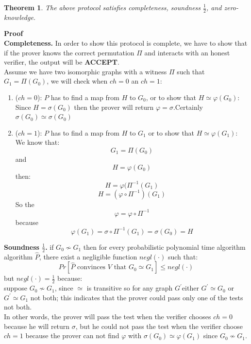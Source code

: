 \documentclass[12pt,a4paper]{article}
\newtheorem{thm}{Theorem}
\begin{document}
\begin{thm}\cite{lec-notes1:3}
The above protocol satisfies completeness, soundness $\frac{1}{2}$, and zero-knowledge.	
\end{thm}
\textbf{Proof}\\
\textbf{Completeness.}
In order to show this protocol is complete, we have to show that if the prover knows the correct permutation $\Pi$ and interacts with an honest verifier, the output will be \textbf{ACCEPT}.\\
Assume we have two isomorphic graphs with a witness $\Pi$ such that $G_1=\Pi(G_0)$, we will check when $ch=0$ an $ch=1$:\\
\begin{enumerate}	
\item
\begin{enumerate}
($ch=0$): $P$ has to find a map from $H$ to $G_0$, or to show that $H\simeq \varphi(G_0)$:\\
Since $H=\sigma(G_0)$ then the prover will return $\varphi = \sigma $.Certainly $\sigma(G_0)\simeq \sigma(G_0) $
\end{enumerate}
	\item
	\begin{enumerate}
($ch=1$): $P$ has to find a map from $H$ to $G_1$ or to show that $H\simeq \varphi(G_1)$:
		We know that: $$G_1=\Pi(G_0)$$ and $$H=\varphi(G_0)$$ then:\\
		$$H=\varphi(\Pi^{-1}(G_1)$$
		$$H=(\varphi \circ 
		\Pi^{-1})(G_1)$$
		So the $$\varphi=\varphi \circ \Pi^{-1}$$
because $$\varphi(G_1)=\sigma \circ \Pi^{-1}(G_1)=\sigma(G_0)=H$$
	\end{enumerate}
\end{enumerate}
\textbf{Soundness $\frac{1}{2}$.}
if $G_0\nsim G_1$ then for every probabilistic polynomial time algorithm algorithm $\hat{P}$, there exist a negligible function $negl(\cdot)$ such that:\\
$$Pr[\hat{P}\text{ convinces } V \text{ that }G_0\simeq G_1]\leq negl(\cdot)$$
but $negl(\cdot)=\frac{1}{2}$ because:\\
suppose $G_0\nsim G_1$, since $\simeq$ is transitive so for any graph ${G}^{'}$either ${G}^{'}\simeq G_0$ or ${G}^{'}\simeq G_1$ not both; this indicates that the prover could pass only one of the tests not both.\\
In other words, the prover will pass the test when the verifier chooses $ch=0$ because he will return $\sigma$, but he could not pass the test when the verifier choose $ch=1$ because the prover can not find $\varphi$ with $\sigma(G_0)\simeq \varphi(G_1)$ since $G_0\nsim G_1$.\\
\end{document}
